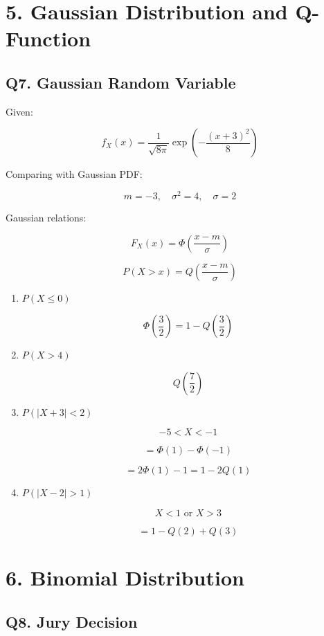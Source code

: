 \documentclass[12pt]{article}
\begin{document}
\section*{5. Gaussian Distribution and Q-Function}

\subsection*{Q7. Gaussian Random Variable}

Given:

\[
f_X(x) =
\frac{1}{\sqrt{8\pi}}
\exp\left(
-\frac{(x+3)^2}{8}
\right)
\]

Comparing with Gaussian PDF:

\[
m = -3,\quad \sigma^2 = 4,\quad \sigma = 2
\]

Gaussian relations:

\[
F_X(x) = \Phi\left(\frac{x-m}{\sigma}\right)
\]

\[
P(X > x) = Q\left(\frac{x-m}{\sigma}\right)
\]

\begin{enumerate}
\item $P(X \le 0)$

\[
\Phi\left(\frac{3}{2}\right)
=
1 - Q\left(\frac{3}{2}\right)
\]

\item $P(X > 4)$

\[
Q\left(\frac{7}{2}\right)
\]

\item $P(|X+3|<2)$

\[
-5 < X < -1
\]

\[
= \Phi(1) - \Phi(-1)
\]

\[
= 2\Phi(1) - 1
= 1 - 2Q(1)
\]

\item $P(|X-2|>1)$

\[
X < 1 \text{ or } X > 3
\]

\[
= 1 - Q(2) + Q(3)
\]

\end{enumerate}

\section*{6. Binomial Distribution}

\subsection*{Q8. Jury Decision}
\end{document}
